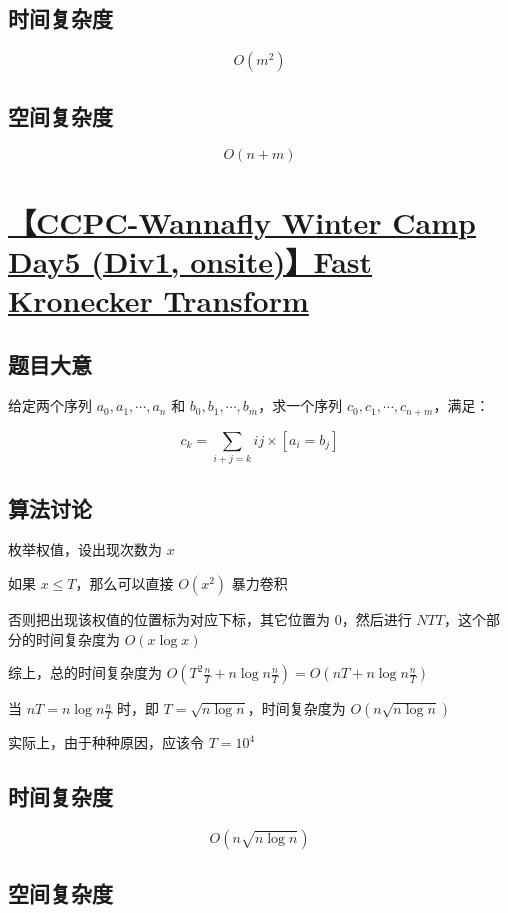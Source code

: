 \documentclass[UTF8]{article}
\begin{document}
\subsection{时间复杂度}

$$
O(m^2)
$$

\subsection{空间复杂度}

$$
O(n+m)
$$

\section{\href{https://www.zhixincode.com/contest/20/problem/E?problem_id=300}{【CCPC-Wannafly Winter Camp Day5 (Div1, onsite)】Fast Kronecker Transform}}

\subsection{题目大意}

给定两个序列 $a_0,a_1, \cdots, a_n$ 和 $b_0,b_1, \cdots, b_m$，求一个序列 $c_0,c_1, \cdots, c_{n+m}$，满足：

$$
c_{k}=\sum_{i+j=k}ij \times [a_i=b_j]
$$

\subsection{算法讨论}

枚举权值，设出现次数为 $x$

如果 $x \le T$，那么可以直接 $O(x^2)$ 暴力卷积

否则把出现该权值的位置标为对应下标，其它位置为 $0$，然后进行 $NTT$，这个部分的时间复杂度为 $O(x \log x)$

综上，总的时间复杂度为 $O(T^2 \frac{n}{T} + n \log n \frac{n}{T})=O(nT+n \log n \frac{n}{T})$

当 $nT=n \log n \frac{n}{T}$ 时，即 $T=\sqrt{n \log n}$，时间复杂度为 $O(n \sqrt {n \log n})$

实际上，由于种种原因，应该令 $T=10^4$

\subsection{时间复杂度}

$$
O(n \sqrt{n \log n})
$$

\subsection{空间复杂度}
\end{document}
